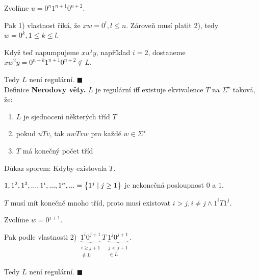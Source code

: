 Zvolíme $u = 0^n 1^{n+1} 0^{n+2}$.

Pak 1) vlastnost říká, že $xw = 0^l, l \leq n$. Zároveň musí platit 2), tedy $w = 0^k, 1 \leq k \leq l$.

Když teď napumpujeme $xw^i y$, například $i=2$, dostaneme $xw^2 y = 0^{n+k} 1^{n+1} 0^{n+2} \not\in L$.

Tedy $L$ není regulární. $\blacksquare$\\

\noindent
Definice \textbf{Nerodovy věty.} $L$ je regulární iff existuje ekvivalence $T$ na $\Sigma^\star$ taková, že:
\begin{enumerate}[1), noitemsep]
    \item $L$ je sjednocení některých tříd $T$
    \item pokud $uTv$, tak $uwTvw$ pro každé $w \in \Sigma^\star$
    \item $T$ má konečný počet tříd
\end{enumerate}
Důkaz sporem:
Kdyby existovala $T$.

$1, 1^2, 1^3, ..., 1^i, ..., 1^n, ... = \left\lbrace 1^j \mid j \geq 1 \right\rbrace$ je nekonečná posloupnost $0$ a $1$.

$T$ musí mít konečně mnoho tříd, proto musí existovat $i > j, i \not= j \land 1^i T 1^j$.

Zvolíme $w = 0^{j + 1}$.

Pak podle vlastnosti 2) $\underbrace{1^i 0^{j+1}}_{\substack{i \geq j+1 \\ \not\in L}} T
\underbrace{1^j 0^{j+1}}_{\substack{j < j+1 \\\in L }}$.

Tedy $L$ není regulární. $\blacksquare$